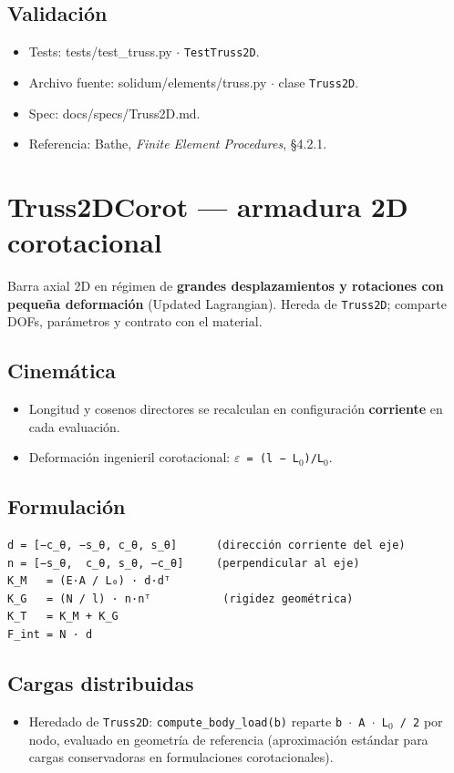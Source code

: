 \documentclass[11pt,letterpaper,oneside]{report}
\begin{document}
\subsection{Validación}
\begin{itemize}
  \item Tests: tests/test\_truss.py \ensuremath{\cdot} \texttt{TestTruss2D}.
  \item Archivo fuente: solidum/elements/truss.py \ensuremath{\cdot} clase \texttt{Truss2D}.
  \item Spec: docs/specs/Truss2D.md.
  \item Referencia: Bathe, \textit{Finite Element Procedures}, §4.2.1.
\end{itemize}


\section{Truss2DCorot --- armadura 2D corotacional}

Barra axial 2D en régimen de \textbf{grandes desplazamientos y rotaciones con pequeña deformación} (Updated Lagrangian). Hereda de \texttt{Truss2D}; comparte DOFs, parámetros y contrato con el material.

\subsection{Cinemática}
\begin{itemize}
  \item Longitud y cosenos directores se recalculan en configuración \textbf{corriente} en cada evaluación.
  \item Deformación ingenieril corotacional: \texttt{\ensuremath{\varepsilon} = (l − L\ensuremath{_{0}})/L\ensuremath{_{0}}}.
\end{itemize}

\subsection{Formulación}
\begin{lstlisting}
d = [−c_θ, −s_θ, c_θ, s_θ]      (dirección corriente del eje)
n = [−s_θ,  c_θ, s_θ, −c_θ]     (perpendicular al eje)
K_M   = (E·A / L₀) · d·dᵀ
K_G   = (N / l) · n·nᵀ           (rigidez geométrica)
K_T   = K_M + K_G
F_int = N · d

\end{lstlisting}

\subsection{Cargas distribuidas}
\begin{itemize}
  \item Heredado de \texttt{Truss2D}: \texttt{compute\_body\_load(b)} reparte \texttt{b \ensuremath{\cdot} A \ensuremath{\cdot} L\ensuremath{_{0}} / 2} por nodo, evaluado en geometría de referencia (aproximación estándar para cargas conservadoras en formulaciones corotacionales).
\end{itemize}
\end{document}
